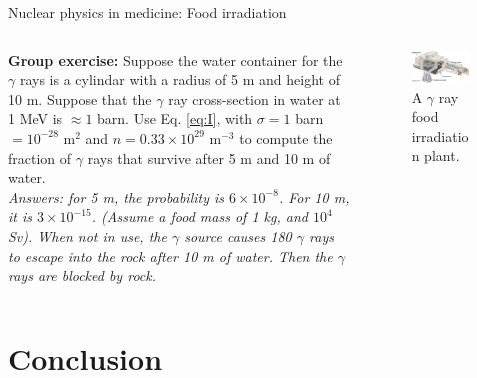 \documentclass{beamer}
\begin{document}
\begin{frame}{Nuclear physics in medicine: Food irradiation}
\begin{columns}[T]
\begin{column}{0.5\textwidth}
\footnotesize
\textbf{Group exercise:} Suppose the water container for the $\gamma$ rays is a cylindar with a radius of 5 m and height of 10 m.  Suppose that the $\gamma$ ray cross-section in water at 1 MeV is $\approx 1$ barn.  Use Eq. \ref{eq:I}, with $\sigma = 1$ barn $= 10^{-28}$ m$^2$ and $n = 0.33 \times 10^{29}$ m$^{-3}$ to compute the fraction of $\gamma$ rays that survive after 5 m and 10 m of water. \\ \vspace{0.5cm}
\textit{Answers: for 5 m, the probability is $6\times 10^{-8}$.  For 10 m, it is $3 \times 10^{-15}$.  (Assume a food mass of 1 kg, and $10^4$ Sv).  When not in use, the $\gamma$ source causes 180 $\gamma$ rays to escape into the rock after 10 m of water.  Then the $\gamma$ rays are blocked by rock.}
\end{column}
\begin{column}{0.5\textwidth}
\footnotesize
\begin{figure}
\centering
\includegraphics[width=0.95\textwidth]{figures/irradiation.png}
\caption{\label{fig:irradiation2} \footnotesize A $\gamma$ ray food irradiation plant.}
\end{figure}
\end{column}
\end{columns}
\end{frame}

\section{Conclusion}
\end{document}
